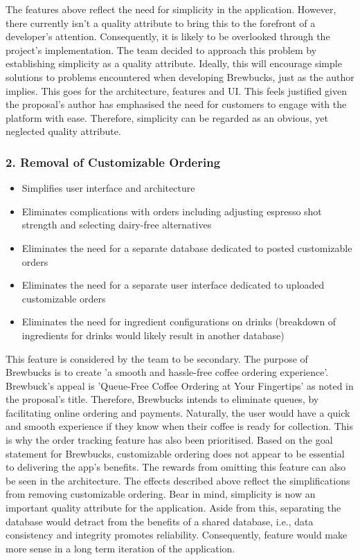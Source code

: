 \documentclass{article}
\begin{document}
\bigskip \noindent The features above reflect the need for simplicity in the application. However, there currently isn't a quality attribute to bring this to the forefront of a developer's attention. Consequently, it is likely to be overlooked through the project's implementation. The team decided to approach this problem by establishing simplicity as a quality attribute. Ideally, this will encourage simple solutions to problems encountered when developing Brewbucks, just as the author implies. This goes for the architecture, features and UI. This feels justified given the proposal's author has emphasised the need for customers to engage with the platform with ease. Therefore, simplicity can be regarded as an obvious, yet neglected quality attribute. 

\subsubsection*{2. Removal of Customizable Ordering}
\begin{itemize}
    \item Simplifies user interface and architecture
    \item Eliminates complications with orders including adjusting espresso shot strength and selecting dairy-free alternatives
    \item Eliminates the need for a separate database dedicated to posted customizable orders
    \item Eliminates the need for a separate user interface dedicated to uploaded customizable orders
    \item Eliminates the need for ingredient configurations on drinks (breakdown of ingredients for drinks would likely result in another database)
\end{itemize}

\bigskip \noindent This feature is considered by the team to be secondary. The purpose of Brewbucks is to create 'a smooth and hassle-free coffee ordering experience'. Brewbuck's appeal is 'Queue-Free Coffee Ordering at Your Fingertips' as noted in the proposal's title. Therefore, Brewbucks intends to eliminate queues, by facilitating online ordering and payments. Naturally, the user would have a quick and smooth experience if they know when their coffee is ready for collection. This is why the order tracking feature has also been prioritised. Based on the goal statement for Brewbucks, customizable ordering does not appear to be essential to delivering the app's benefits. The rewards from omitting this feature can also be seen in the architecture. The effects described above reflect the simplifications from removing customizable ordering. Bear in mind, simplicity is now an important quality attribute for the application. Aside from this, separating the database would detract from the benefits of a shared database, i.e., data consistency and integrity promotes reliability. Consequently, feature would make more sense in a long term iteration of the application. 
\end{document}
